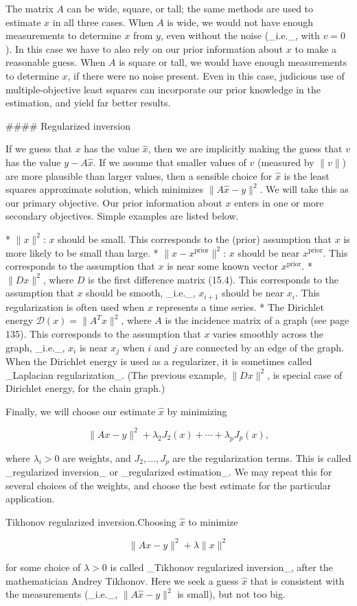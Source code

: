 The matrix \(A\) can be wide, square, or tall; the same methods are used to estimate \(x\) in all three cases. When \(A\) is wide, we would not have enough measurements to determine \(x\) from \(y\), even without the noise (_i.e._, with \(v=0\)). In this case we have to also rely on our prior information about \(x\) to make a reasonable guess. When \(A\) is square or tall, we would have enough measurements to determine \(x\), if there were no noise present. Even in this case, judicious use of multiple-objective least squares can incorporate our prior knowledge in the estimation, and yield far better results.

#### Regularized inversion

If we guess that \(x\) has the value \(\hat{x}\), then we are implicitly making the guess that \(v\) has the value \(y-A\hat{x}\). If we assume that smaller values of \(v\) (measured by \(\|v\|\)) are more plausible than larger values, then a sensible choice for \(\hat{x}\) is the least squares approximate solution, which minimizes \(\|A\hat{x}-y\|^{2}\). We will take this as our primary objective. Our prior information about \(x\) enters in one or more secondary objectives. Simple examples are listed below.

* \(\|x\|^{2}\): \(x\) should be small. This corresponds to the (prior) assumption that \(x\) is more likely to be small than large.
* \(\|x-x^{\text{prior}}\|^{2}\): \(x\) should be near \(x^{\text{prior}}\). This corresponds to the assumption that \(x\) is near some known vector \(x^{\text{prior}}\).
* \(\|Dx\|^{2}\), where \(D\) is the first difference matrix (15.4). This corresponds to the assumption that \(x\) should be smooth, _i.e._, \(x_{i+1}\) should be near \(x_{i}\). This regularization is often used when \(x\) represents a time series.
* The Dirichlet energy \(\mathcal{D}(x)=\|A^{T}x\|^{2}\), where \(A\) is the incidence matrix of a graph (see page 135). This corresponds to the assumption that \(x\) varies smoothly across the graph, _i.e._, \(x_{i}\) is near \(x_{j}\) when \(i\) and \(j\) are connected by an edge of the graph. When the Dirichlet energy is used as a regularizer, it is sometimes called _Laplacian regularization_. (The previous example, \(\|Dx\|^{2}\), is special case of Dirichlet energy, for the chain graph.)

Finally, we will choose our estimate \(\hat{x}\) by minimizing

\[\|Ax-y\|^{2}+\lambda_{2}J_{2}(x)+\cdots+\lambda_{p}J_{p}(x),\]

where \(\lambda_{i}>0\) are weights, and \(J_{2},\ldots,J_{p}\) are the regularization terms. This is called _regularized inversion_ or _regularized estimation_. We may repeat this for several choices of the weights, and choose the best estimate for the particular application.

Tikhonov regularized inversion.Choosing \(\hat{x}\) to minimize

\[\|Ax-y\|^{2}+\lambda\|x\|^{2}\]

for some choice of \(\lambda>0\) is called _Tikhonov regularized inversion_, after the mathematician Andrey Tikhonov. Here we seek a guess \(\hat{x}\) that is consistent with the measurements (_i.e._, \(\|A\hat{x}-y\|^{2}\) is small), but not too big.

 